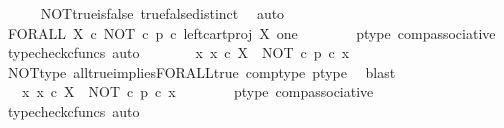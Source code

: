 \begin{isabellebody}
\ \ \ \ \isamarkupfalse%
\ NOT{\isacharunderscore}{\kern0pt}true{\isacharunderscore}{\kern0pt}is{\isacharunderscore}{\kern0pt}false\ true{\isacharunderscore}{\kern0pt}false{\isacharunderscore}{\kern0pt}distinct\ \isamarkupfalse%
\ auto\isanewline
\ \ \isamarkupfalse%
\ \isamarkupfalse%
\ {\isachardoublequoteopen}FORALL\ X\ {\isasymcirc}\isactrlsub c\ {\isacharparenleft}{\kern0pt}{\isacharparenleft}{\kern0pt}NOT\ {\isasymcirc}\isactrlsub c\ p{\isacharparenright}{\kern0pt}\ {\isasymcirc}\isactrlsub c\ left{\isacharunderscore}{\kern0pt}cart{\isacharunderscore}{\kern0pt}proj\ X\ one{\isacharparenright}{\kern0pt}\isactrlsup {\isasymsharp}\ {\isasymnoteq}\ {\isasymt}{\isachardoublequoteclose}\isanewline
\ \ \ \ \isamarkupfalse%
\ p{\isacharunderscore}{\kern0pt}type\ comp{\isacharunderscore}{\kern0pt}associative{}\ \isamarkupfalse%
\ {\isacharparenleft}{\kern0pt}typecheck{\isacharunderscore}{\kern0pt}cfuncs{\isacharcomma}{\kern0pt}\ auto{\isacharparenright}{\kern0pt}\isanewline
\ \ \isamarkupfalse%
\ \isamarkupfalse%
\ {\isachardoublequoteopen}{\isasymnot}\ {\isacharparenleft}{\kern0pt}{\isasymforall}\ x{\isachardot}{\kern0pt}\ x\ {\isasymin}\isactrlsub c\ X\ {\isasymlongrightarrow}\ {\isacharparenleft}{\kern0pt}NOT\ {\isasymcirc}\isactrlsub c\ p{\isacharparenright}{\kern0pt}\ {\isasymcirc}\isactrlsub c\ x\ {\isacharequal}{\kern0pt}\ {\isasymt}{\isacharparenright}{\kern0pt}{\isachardoublequoteclose}\isanewline
\ \ \ \ \isamarkupfalse%
\ NOT{\isacharunderscore}{\kern0pt}type\ all{\isacharunderscore}{\kern0pt}true{\isacharunderscore}{\kern0pt}implies{\isacharunderscore}{\kern0pt}FORALL{\isacharunderscore}{\kern0pt}true\ comp{\isacharunderscore}{\kern0pt}type\ p{\isacharunderscore}{\kern0pt}type\ \isamarkupfalse%
\ blast\isanewline
\ \ \isamarkupfalse%
\ \isamarkupfalse%
\ {\isachardoublequoteopen}{\isasymnot}\ {\isacharparenleft}{\kern0pt}{\isasymforall}\ x{\isachardot}{\kern0pt}\ x\ {\isasymin}\isactrlsub c\ X\ {\isasymlongrightarrow}\ NOT\ {\isasymcirc}\isactrlsub c\ {\isacharparenleft}{\kern0pt}p\ {\isasymcirc}\isactrlsub c\ x{\isacharparenright}{\kern0pt}\ {\isacharequal}{\kern0pt}\ {\isasymt}{\isacharparenright}{\kern0pt}{\isachardoublequoteclose}\isanewline
\ \ \ \ \isamarkupfalse%
\ p{\isacharunderscore}{\kern0pt}type\ comp{\isacharunderscore}{\kern0pt}associative{}\ \isamarkupfalse%
\ {\isacharparenleft}{\kern0pt}typecheck{\isacharunderscore}{\kern0pt}cfuncs{\isacharcomma}{\kern0pt}\ auto{\isacharparenright}{\kern0pt}\isanewline

\end{isabellebody}
